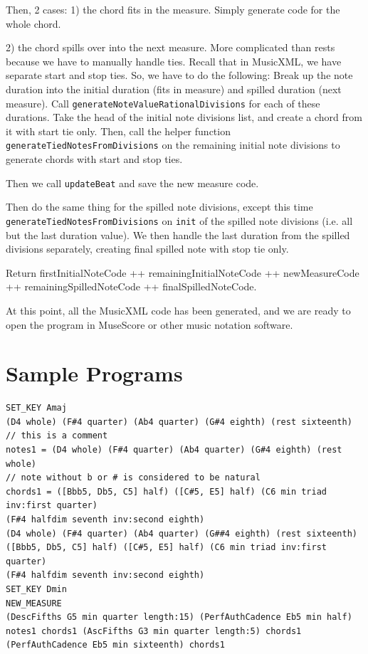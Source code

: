 \documentclass{report}
\begin{document}
Then, 2 cases:
1) the chord fits in the measure. Simply generate code for the whole chord.

2) the chord spills  over into the  next measure. More complicated than rests because we have to manually handle ties. Recall that in MusicXML, we have separate start and stop ties. So, we have to do the following:
Break up the note duration into the initial duration (fits in measure) and spilled duration (next measure). Call \verb.generateNoteValueRationalDivisions. for each of these durations. Take the head of the initial note divisions list, and create a chord from it with start tie only. Then, call the helper function \verb.generateTiedNotesFromDivisions. on the remaining initial note divisions to generate chords with start and stop ties.

Then we call \verb.updateBeat. and save the new measure code. 

Then do the same thing for the spilled note divisions, except this time \verb.generateTiedNotesFromDivisions. on \verb.init. of the spilled note divisions (i.e. all but the last duration value). We then handle the last duration from the spilled divisions separately, creating final spilled  note with stop tie only.

Return firstInitialNoteCode ++ remainingInitialNoteCode ++ newMeasureCode ++ remainingSpilledNoteCode ++ finalSpilledNoteCode.

At this point, all the MusicXML code has been generated, and we are ready to open the program in MuseScore or other music notation software.

\chapter{Sample Programs}
\begin{verbatim}
SET_KEY Amaj
(D4 whole) (F#4 quarter) (Ab4 quarter) (G#4 eighth) (rest sixteenth)           
// this is a comment
notes1 = (D4 whole) (F#4 quarter) (Ab4 quarter) (G#4 eighth) (rest whole)  
// note without b or # is considered to be natural
chords1 = ([Bbb5, Db5, C5] half) ([C#5, E5] half) (C6 min triad inv:first quarter) 
(F#4 halfdim seventh inv:second eighth)
(D4 whole) (F#4 quarter) (Ab4 quarter) (G##4 eighth) (rest sixteenth)
([Bbb5, Db5, C5] half) ([C#5, E5] half) (C6 min triad inv:first quarter) 
(F#4 halfdim seventh inv:second eighth)
SET_KEY Dmin
NEW_MEASURE
(DescFifths G5 min quarter length:15) (PerfAuthCadence Eb5 min half)
notes1 chords1 (AscFifths G3 min quarter length:5) chords1 
(PerfAuthCadence Eb5 min sixteenth) chords1
\end{verbatim}
\end{document}
